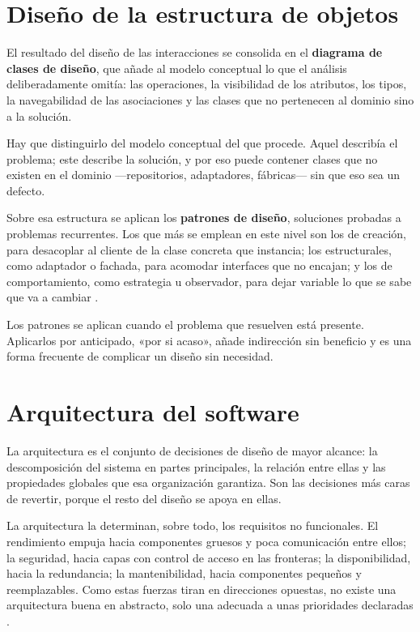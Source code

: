 \section{Diseño de la estructura de objetos}

El resultado del diseño de las interacciones se consolida en el \textbf{diagrama
de clases de diseño}, que añade al modelo conceptual lo que el análisis
deliberadamente omitía: las operaciones, la visibilidad de los atributos, los
tipos, la navegabilidad de las asociaciones y las clases que no pertenecen al
dominio sino a la solución.

Hay que distinguirlo del modelo conceptual del que procede. Aquel describía el
problema; este describe la solución, y por eso puede contener clases que no
existen en el dominio —repositorios, adaptadores, fábricas— sin que eso sea un
defecto.

Sobre esa estructura se aplican los \textbf{patrones de diseño}, soluciones
probadas a problemas recurrentes. Los que más se emplean en este nivel son los de
creación, para desacoplar al cliente de la clase concreta que instancia; los
estructurales, como adaptador o fachada, para acomodar interfaces que no encajan;
y los de comportamiento, como estrategia u observador, para dejar variable lo que
se sabe que va a cambiar \cite{larman2006}.

Los patrones se aplican cuando el problema que resuelven está presente. Aplicarlos
por anticipado, «por si acaso», añade indirección sin beneficio y es una forma
frecuente de complicar un diseño sin necesidad.

\section{Arquitectura del software}

La arquitectura es el conjunto de decisiones de diseño de mayor alcance: la
descomposición del sistema en partes principales, la relación entre ellas y las
propiedades globales que esa organización garantiza. Son las decisiones más caras
de revertir, porque el resto del diseño se apoya en ellas.

La arquitectura la determinan, sobre todo, los requisitos no funcionales. El
rendimiento empuja hacia componentes gruesos y poca comunicación entre ellos; la
seguridad, hacia capas con control de acceso en las fronteras; la disponibilidad,
hacia la redundancia; la mantenibilidad, hacia componentes pequeños y
reemplazables. Como estas fuerzas tiran en direcciones opuestas, no existe una
arquitectura buena en abstracto, solo una adecuada a unas prioridades declaradas
\cite{sommerville2016}.

